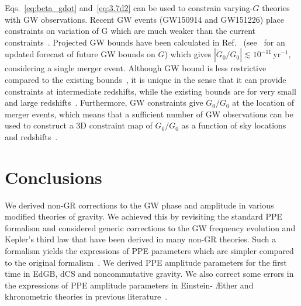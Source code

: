 \documentclass[prd,twocolumn,nofootinbib]{revtex4-1}
\begin{document}

Eqs.~\eqref{eq:beta_gdot} and~\eqref{eq:3.7d2} can be used to constrain varying-$G$ theories with GW observations. Recent GW events (GW150914 and GW151226) place constraints on variation of G which are much weaker than the current constraints~\cite{Yunes:2016jcc}. 
Projected GW bounds have been calculated in Ref.~\cite{Yunes:2009bv} (see~\cite{Chamberlain:2017fjl} for an updated forecast of future GW bounds on $\dot G$) which gives $|\dot{G}_0/G_0| \lesssim 10^{-11}\, \mathrm{yr}^{-1}$, considering a single merger event. Although GW bound is less restrictive compared to the existing bounds~\cite{Will2006}, it is unique in the sense that it can provide constraints at intermediate redshifts, while the existing bounds are for very small and large redshifts~\cite{Yunes:2009bv}. Furthermore, GW constraints give $\dot{G}_0/G_0$ at the location of merger events, which means that a sufficient number of GW observations can be used to construct a 3D constraint map of $\dot{G}_0/G_0$ as a function of sky locations and redshifts~\cite{Yunes:2009bv}. %
 



\section{Conclusions}\label{conclusions}

We derived non-GR corrections to the GW phase and amplitude in various modified theories of gravity. We achieved this by revisiting the standard PPE formalism and considered generic corrections to the GW frequency evolution and Kepler's third law that have been derived in many non-GR theories. Such a formalism yields the expressions of PPE parameters which are simpler compared to the original formalism~\cite{Yunes:2009ke,Chatziioannou:2012rf}. %
We derived PPE amplitude parameters for the first time in EdGB, dCS and noncommutative gravity. 
We also correct some errors in the expressions of PPE amplitude parameters in Einstein- \AE ther and khronometric theories in previous literature~\cite{Hansen:2014ewa}.
\end{document}
